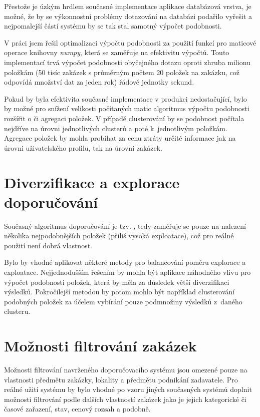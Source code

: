 \documentclass[thesis=M,czech]{FITthesis}[2019/12/23]
\begin{document}
Přestože je úzkým hrdlem současné implementace aplikace databázová vrstva, je možné, že by se výkonnostní problémy dotazování na databázi podařilo vyřešit a nejpomalejší částí systému by se tak stal samotný výpočet podobnosti.

V práci jsem řešil optimalizaci výpočtu podobnosti za použití funkcí pro maticové operace knihovny \textit{numpy}, která se zaměřuje na efektivitu výpočtů.
Touto implementací trvá výpočet podobnosti obyčejného dotazu oproti zhruba milionu položkám (50 tisíc zakázek s průměrným počtem 20 položek na zakázku, což odpovídá množství dat za jeden rok) řádově jednotky sekund.

Pokud by byla efektivita současné implementace v produkci nedostačující, bylo by možné pro snížení velikosti počítaných matic algoritmus výpočtu podobnosti rozšířit o  či agregaci položek. V případě clusterování by se podobnost počítala nejdříve na úrovni jednotlivých clusterů a poté k~jednotlivým položkám. Agregace položek by mohla probíhat za cenu ztráty určité informace jak na úrovni uživatelského profilu, tak na úrovni zakázek.

\section{Diverzifikace a explorace doporučování}

Současný algoritmus doporučování je tzv. , tedy zaměřuje se pouze na nalezení několika nejpodobnějších položek (příliš vysoká exploatace), což pro reálné použití není dobrá vlastnost.

Bylo by vhodné aplikovat některé metody pro balancování poměru explorace a exploatace. 
Nejjednodušším řešením by mohla být aplikace náhodného vlivu pro výpočet podobnosti položek, která by měla za důsledek větší diverzifikaci výsledků. Pokročilejší metodou by potom mohlo být například clusterování podobných položek za účelem vybírání pouze podmnožiny výsledků z~daného clusteru.

\section{Možnosti filtrování zakázek}

Možnosti filtrování navrženého doporučovacího systému jsou omezené pouze na vlastnosti předmětu zakázky, lokality a předmětu podnikání zadavatele. Pro reálné užití systému by bylo vhodné po vzoru jiných současných systémů doplnit možnosti filtrování podle dalších vlastností zakázek jako je jejich kategorické či časové zařazení, stav, cenový rozsah a podobně.
\end{document}
